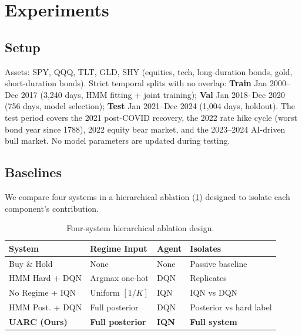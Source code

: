 \documentclass[sigconf,nonacm]{acmart}
\begin{document}
\section{Experiments}
\label{sec:experiments}

\subsection{Setup}
Assets: SPY, QQQ, TLT, GLD, SHY (equities, tech, long-duration bonds,
gold, short-duration bonds).
Strict temporal splits with no overlap:
\textbf{Train} Jan 2000--Dec 2017 (3,240 days, HMM fitting + joint training);
\textbf{Val} Jan 2018--Dec 2020 (756 days, model selection);
\textbf{Test} Jan 2021--Dec 2024 (1,004 days, holdout).
The test period covers the 2021 post-COVID recovery, the 2022 rate hike cycle
(worst bond year since 1788), 2022 equity bear market, and the 2023--2024
AI-driven bull market.
No model parameters are updated during testing.

\subsection{Baselines}
We compare four systems in a hierarchical ablation (\cref{tab:ablation})
designed to isolate each component's contribution.

\begin{table}[h]
  \caption{Four-system hierarchical ablation design.}
  \label{tab:ablation}
  \small
  \begin{tabular}{llll}
    \toprule
    System & Regime Input & Agent & Isolates \\
    \midrule
    Buy \& Hold          & None            & None & Passive baseline \\
    HMM Hard + DQN       & Argmax one-hot  & DQN  & Replicates \cite{almahdi2019} \\
    No Regime + IQN      & Uniform $[1/K]$ & IQN  & IQN vs DQN \\
    HMM Post. + DQN      & Full posterior  & DQN  & Posterior vs hard label \\
    \textbf{UARC (Ours)} & \textbf{Full posterior} & \textbf{IQN} & \textbf{Full system} \\
    \bottomrule
  \end{tabular}
\end{table}
\end{document}

